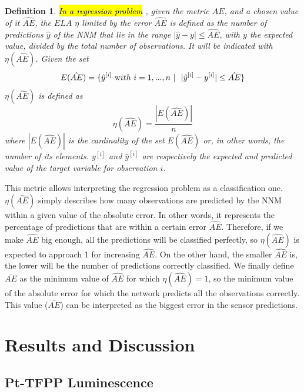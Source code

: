 \documentclass[sensors,article,accept,moreauthors,pdftex,10pt,a4paper]{Definitions/mdpi}
\newtheorem*{definition*}{Definition}
\begin{document}
\begin{definition*}
\hl{In a regression problem}%
, given the metric $AE$, and a chosen value of it $\hat{AE}$, the $ELA$  $\eta$ limited by the error $\hat{AE}$ is defined as the number of predictions $\hat y$ of the NNM that lie in the range $|\hat y-y|\leq \hat{AE}$, with $y$ the expected value, divided by the total number of observations. It will be indicated with $\eta(\hat{AE})$. Given the set
\begin{equation}
E(\hat{AE}) = \{ \hat y^{[i]} \ {\text with } \ i = 1,..., n\ | \ \ |\hat y^{[i]}-y^{[i]}|\leq \hat{AE} \} 
\end{equation}
$\eta(\hat{AE})$ is defined as
\begin{equation}
\eta(\hat{AE}) = \frac{|E(\hat{AE})|}{n}
\end{equation}
where $|E(\hat{AE})|$ is the cardinality of the set $E(\hat{AE})$ or, in other words, the number of its elements. $ y^{[i]}$ and $\hat y^{[i]}$ are respectively the expected and predicted value of the target variable for observation $i$.
\end{definition*}

This metric allows interpreting the regression problem as a classification one. $\eta(\hat{AE})$ simply describes how many observations are predicted by the NNM within a given value of the absolute error. In other words, it represents the percentage of predictions that are within a certain error $\hat{AE}$. Therefore, if we make $\hat{AE}$ big enough, all the predictions will be classified perfectly, so $\eta(\hat{AE})$ is expected to approach 1 for increasing $\hat{AE}$. On the other hand, the smaller $\hat{AE}$ is, the lower will be the number of predictions correctly classified. We finally define $\overline{AE}$ as the minimum value of $\hat{AE}$ for which $\eta(\hat{AE})=1$, so the minimum value of the absolute error for which the network predicts all the observations correctly. This value ($\overline{AE}$) can be interpreted as the biggest error in the sensor predictions.


\section{Results and Discussion}
\label{Results}

\subsection{Pt-TFPP Luminescence}
\end{document}
